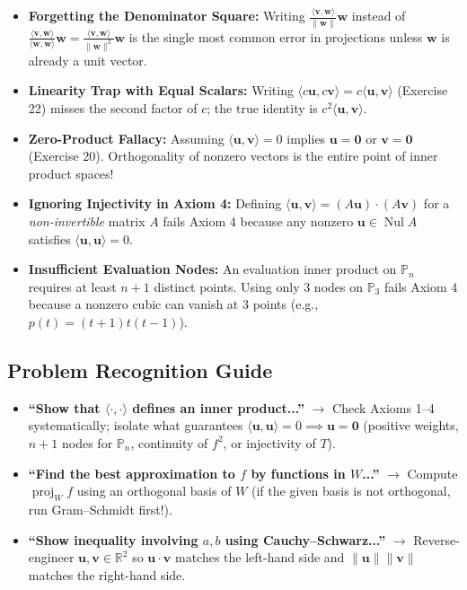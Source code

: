 \documentclass[11pt, letterpaper]{article}
\theoremstyle{definition}
\theoremstyle{remark}
\begin{document}
\begin{itemize}
    \item \textbf{Forgetting the Denominator Square:} Writing $\frac{\langle \mathbf{v}, \mathbf{w} \rangle}{\|\mathbf{w}\|}\mathbf{w}$ instead of $\frac{\langle \mathbf{v}, \mathbf{w} \rangle}{\langle \mathbf{w}, \mathbf{w} \rangle}\mathbf{w} = \frac{\langle \mathbf{v}, \mathbf{w} \rangle}{\|\mathbf{w}\|^2}\mathbf{w}$ is the single most common error in projections unless $\mathbf{w}$ is already a unit vector.
    \item \textbf{Linearity Trap with Equal Scalars:} Writing $\langle c\mathbf{u}, c\mathbf{v} \rangle = c\langle \mathbf{u}, \mathbf{v} \rangle$ (Exercise 22) misses the second factor of $c$; the true identity is $c^2 \langle \mathbf{u}, \mathbf{v} \rangle$.
    \item \textbf{Zero-Product Fallacy:} Assuming $\langle \mathbf{u}, \mathbf{v} \rangle = 0$ implies $\mathbf{u} = \mathbf{0}$ or $\mathbf{v} = \mathbf{0}$ (Exercise 20). Orthogonality of nonzero vectors is the entire point of inner product spaces!
    \item \textbf{Ignoring Injectivity in Axiom 4:} Defining $\langle \mathbf{u}, \mathbf{v} \rangle = (A\mathbf{u})\cdot(A\mathbf{v})$ for a \emph{non-invertible} matrix $A$ fails Axiom 4 because any nonzero $\mathbf{u} \in \operatorname{Nul} A$ satisfies $\langle \mathbf{u}, \mathbf{u} \rangle = 0$.
    \item \textbf{Insufficient Evaluation Nodes:} An evaluation inner product on $\mathbb{P}_n$ requires at least $n+1$ distinct points. Using only $3$ nodes on $\mathbb{P}_3$ fails Axiom 4 because a nonzero cubic can vanish at $3$ points (e.g., $p(t) = (t+1)t(t-1)$).
\end{itemize}

\subsection{Problem Recognition Guide}

\begin{itemize}
    \item \textbf{``Show that $\langle \cdot, \cdot \rangle$ defines an inner product...''} $\longrightarrow$ Check Axioms 1--4 systematically; isolate what guarantees $\langle \mathbf{u}, \mathbf{u} \rangle = 0 \implies \mathbf{u} = \mathbf{0}$ (positive weights, $n+1$ nodes for $\mathbb{P}_n$, continuity of $f^2$, or injectivity of $T$).
    \item \textbf{``Find the best approximation to $f$ by functions in $W$...''} $\longrightarrow$ Compute $\operatorname{proj}_W f$ using an orthogonal basis of $W$ (if the given basis is not orthogonal, run Gram--Schmidt first!).
    \item \textbf{``Show inequality involving $a, b$ using Cauchy--Schwarz...''} $\longrightarrow$ Reverse-engineer $\mathbf{u}, \mathbf{v} \in \mathbb{R}^2$ so $\mathbf{u} \cdot \mathbf{v}$ matches the left-hand side and $\|\mathbf{u}\| \|\mathbf{v}\|$ matches the right-hand side.
\end{itemize}
\end{document}
